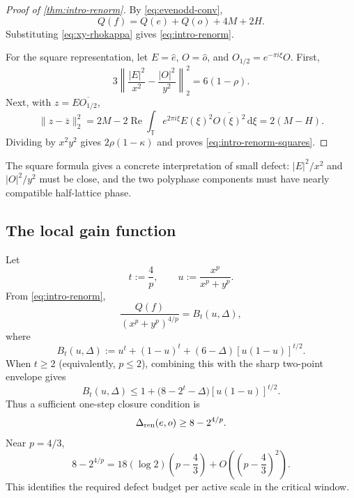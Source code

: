 \documentclass[11pt,reqno]{amsart}
\numberwithin{equation}{section}
\theoremstyle{definition}
\theoremstyle{remark}
\newcommand{\T}{\mathbb T}
\newcommand{\dd}{\,\mathrm d}
\newcommand{\norm}[1]{\lVert #1\rVert}
\begin{document}
\begin{proof}[Proof of \cref{thm:intro-renorm}]
By \eqref{eq:evenodd-conv},
\begin{equation}\label{eq:Q-evenodd}
  Q(f)=Q(e)+Q(o)+4M+2H.
\end{equation}
Substituting \eqref{eq:xy-rhokappa} gives
\eqref{eq:intro-renorm}.

For the square representation, let $E=\widehat e$, $O=\widehat o$, and
$O_{1/2}=e^{-\pi i\xi}O$.  First,
\[
  3\left\|
  \frac{|E|^2}{x^2}-\frac{|O|^2}{y^2}
  \right\|_2^2
  =6(1-\rho).
\]
Next, with $z=E\overline{O_{1/2}}$,
\[
  \norm{z-\overline z}_2^2
  =2M-2\operatorname{Re}\int_{\T}e^{2\pi i\xi}E(\xi)^2
       \overline{O(\xi)^2}\dd\xi
  =2(M-H).
\]
Dividing by $x^2y^2$ gives $2\rho(1-\kappa)$ and proves
\eqref{eq:intro-renorm-squares}.
\end{proof}

The square formula gives a concrete interpretation of small defect:
$|E|^2/x^2$ and $|O|^2/y^2$ must be close, and the two polyphase components
must have nearly compatible half-lattice phase.

\subsection{The local gain function}

Let
\[
  t:=\frac4p,
  \qquad
  u:=\frac{x^p}{x^p+y^p}.
\]
From \eqref{eq:intro-renorm},
\begin{equation}\label{eq:Bt-def}
  \frac{Q(f)}{(x^p+y^p)^{4/p}}
  =B_t(u,\Delta),
\end{equation}
where
\begin{equation}\label{eq:Bt}
  B_t(u,\Delta)
  :=u^t+(1-u)^t+(6-\Delta)[u(1-u)]^{t/2}.
\end{equation}
When $t\ge 2$ (equivalently, $p\le 2$), combining this with the sharp two-point envelope gives
\begin{equation}\label{eq:Bt-envelope}
  B_t(u,\Delta)
  \le1+\bigl(8-2^t-\Delta\bigr)[u(1-u)]^{t/2}.
\end{equation}
Thus a sufficient one-step closure condition is
\begin{equation}\label{eq:one-step-budget}
  \Delta_{\rm ren}(e,o)\ge8-2^{4/p}.
\end{equation}
Near $p=4/3$,
\begin{equation}\label{eq:defect-budget-expansion}
  8-2^{4/p}
  =18(\log2)\left(p-\frac43\right)
   +O\left(\left(p-\frac43\right)^2\right).
\end{equation}
This identifies the required defect budget per active scale in the critical
window.
\end{document}
